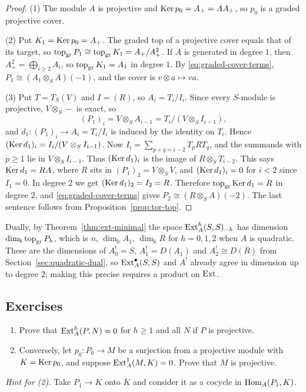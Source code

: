 \begin{supplementary}
\begin{proof}
(1) The module $A$ is projective and $\operatorname{Ker}\nolimits p_0=A_+=AA_+$, so $p_0$ is a graded projective cover.

(2) Put $K_1=\operatorname{Ker}\nolimits p_0=A_+$.
The graded top of a projective cover equals that of its target, so $\operatorname{top}\nolimits_{\mathrm{gr}} P_1\cong\operatorname{top}\nolimits_{\mathrm{gr}} K_1=A_+/A_+^2$.
If $A$ is generated in degree $1$, then $A_+^2=\bigoplus_{i\geq2}A_i$, so $\operatorname{top}\nolimits_{\mathrm{gr}} K_1=A_1$ in degree $1$.
By \eqref{eq:graded-cover-terms}, $P_1\cong(A_1\otimes_SA)(-1)$, and the cover is $v\otimes a\mapsto va$.

(3) Put $T=T_S(V)$ and $I=(R)$, so $A_i=T_i/I_i$.
Since every $S$-module is projective, $V\otimes_S-$ is exact, so
\[
(P_1)_i=V\otimes_SA_{i-1}=T_i/(V\otimes_SI_{i-1}),
\]
and $d_1:(P_1)_i\to A_i=T_i/I_i$ is induced by the identity on $T_i$.
Hence $(\operatorname{Ker}\nolimits d_1)_i=I_i/(V\otimes_SI_{i-1})$.
Now $I_i=\sum_{p+q=i-2}T_pRT_q$, and the summands with $p\geq1$ lie in $V\otimes_SI_{i-1}$.
Thus $(\operatorname{Ker}\nolimits d_1)_i$ is the image of $R\otimes_ST_{i-2}$.
This says $\operatorname{Ker}\nolimits d_1=RA$, where $R$ sits in $(P_1)_2=V\otimes_SV$, and $(\operatorname{Ker}\nolimits d_1)_i=0$ for $i<2$ since $I_1=0$.
In degree $2$ we get $(\operatorname{Ker}\nolimits d_1)_2=I_2=R$.
Therefore $\operatorname{top}\nolimits_{\mathrm{gr}}\operatorname{Ker}\nolimits d_1=R$ in degree $2$, and \eqref{eq:graded-cover-terms} gives $P_2\cong(R\otimes_SA)(-2)$.
The last sentence follows from Proposition~\ref{prop:tor-top}.
\end{proof}
\end{supplementary}

Dually, by Theorem~\ref{thm:ext-minimal} the space $\operatorname{Ext}\nolimits_A^h(S,S)_{-h}$ has dimension $\dim_\Bbbk\operatorname{top}\nolimits_{\mathrm{gr}} P_h$, which is $n$, $\dim_\Bbbk A_1$, $\dim_\Bbbk R$ for $h=0,1,2$ when $A$ is quadratic.
These are the dimensions of $A^!_0=S$, $A^!_1=D(A_1)$ and $A^!_2\cong D(R)$ from Section~\ref{sec:quadratic-dual}, so $\operatorname{Ext}\nolimits_A^\bullet(S,S)$ and $A^!$ already agree in dimension up to degree $2$; making this precise requires a product on $\operatorname{Ext}\nolimits$.

\subsection{Exercises}

\begin{exercise}
\begin{enumerate}
\item Prove that $\operatorname{Ext}\nolimits_A^h(P,N)=0$ for $h\geq1$ and all $N$ if $P$ is projective.
\item Conversely, let $p_0:P_0\to M$ be a surjection from a projective module with $K=\operatorname{Ker}\nolimits p_0$, and suppose $\operatorname{Ext}\nolimits_A^1(M,K)=0$.
Prove that $M$ is projective.
\end{enumerate}
\emph{Hint for (2).} Take $P_1\to K$ onto $K$ and consider it as a cocycle in $\operatorname{Hom}\nolimits_A(P_1,K)$.
\end{exercise}

